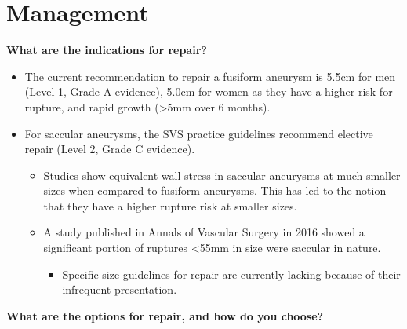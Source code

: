 \documentclass[
]{book}
\providecommand{\tightlist}{%
  \setlength{\itemsep}{0pt}\setlength{\parskip}{0pt}}
\begin{document}
\hypertarget{management-15}{%
\section{Management}\label{management-15}}

\textbf{What are the indications for repair?}
\citep{mooreVascularEndovascularSurgery2019}

\begin{itemize}
\item
  The current recommendation to repair a fusiform aneurysm is 5.5cm
  for men (Level 1, Grade A evidence), 5.0cm for women as they have a
  higher risk for rupture, and rapid growth (\textgreater5mm over 6 months).
  \citep{chaikofSocietyVascularSurgery2018a}
\item
  For saccular aneurysms, the SVS practice guidelines recommend
  elective repair (Level 2, Grade C evidence).
  \citep{chaikofSocietyVascularSurgery2018a}

  \begin{itemize}
  \item
    Studies show equivalent wall stress in saccular aneurysms at
    much smaller sizes when compared to fusiform aneurysms. This has
    led to the notion that they have a higher rupture risk at
    smaller sizes.
  \item
    A study published in Annals of Vascular Surgery in 2016 showed a
    significant portion of ruptures \textless55mm in size were saccular in
    nature. \citep{kristmundssonMorphologySmallAbdominal2016}

    \begin{itemize}
    \tightlist
    \item
      Specific size guidelines for repair are currently lacking
      because of their infrequent presentation.
    \end{itemize}
  \end{itemize}
\end{itemize}

\textbf{What are the options for repair, and how do you choose?}
\citep{mooreVascularEndovascularSurgery2019, fairman72AortoiliacAneurysms2019}
\end{document}
